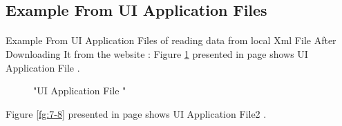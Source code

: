 \documentclass[12pt,a4paper,class,twoside,openany]{report}
\begin{document}
{\subsection{Example From UI Application Files}
 \paragraph*{\hspace{.9 cm} }	Example From UI Application Files of reading data from local Xml File After Downloading It from the website :
 	Figure \ref{fg:7-7} presented in page \pageref{fg:7-7} shows UI Application File .
\begin{figure}
\begin{center}
\caption{"UI Application File "}
\label{fg:7-7}
\end{center}
\end{figure}
Figure \ref{fg:7-8} presented in page \pageref{fg:7-8} shows UI Application File2 .
\begin{figure}
\begin{center}
\end{center}
\end{figure}}
\end{document}

